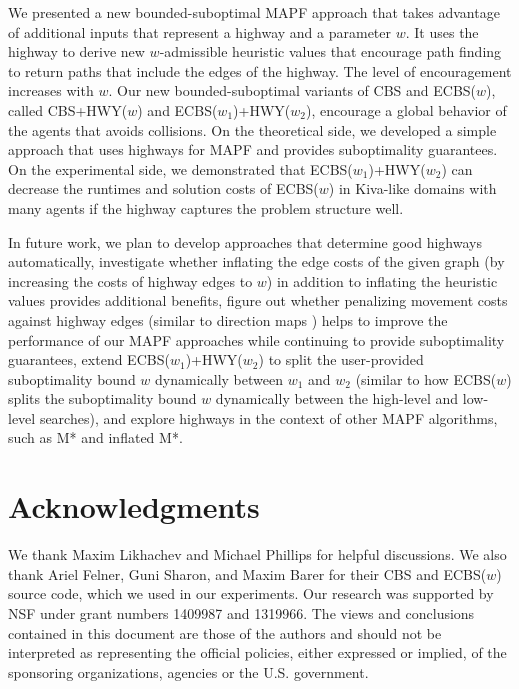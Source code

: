 \documentclass[letterpaper]{article}
\theoremstyle{definition}
\begin{document}
We presented a new bounded-suboptimal MAPF approach that takes advantage of
additional inputs that represent a highway and a parameter $w$. It uses the
highway to derive new $w$-admissible heuristic values that encourage path
finding to return paths that include the edges of the highway. The level of
encouragement increases with $w$. Our new bounded-suboptimal variants of CBS
and ECBS($w$), called CBS+HWY($w$) and ECBS($w_1$)+HWY($w_2$), encourage a
global behavior of the agents that avoids collisions. On the theoretical side,
we developed a simple approach that uses highways for MAPF and provides
suboptimality guarantees. On the experimental side, we demonstrated that
ECBS($w_1$)+HWY($w_2$) can decrease the runtimes and solution costs of
ECBS($w$) in Kiva-like domains with many agents if the highway captures the
problem structure well.

In future work, we plan to develop approaches that determine good highways
automatically, investigate whether inflating the edge costs of the given graph
(by increasing the costs of highway edges to $w$) in addition to inflating
the heuristic values provides additional benefits, figure out whether
penalizing movement costs against highway edges (similar to direction maps
\cite{JS:AIIDE:08}) helps to improve the performance of our MAPF approaches
while continuing to provide suboptimality guarantees, extend
ECBS($w_1$)+HWY($w_2$) to split the user-provided suboptimality bound $w$
dynamically between $w_1$ and $w_2$ (similar to how ECBS($w$) splits the
suboptimality bound $w$ dynamically between the high-level and low-level
searches), and explore highways in the context of other MAPF algorithms, such
as M* and inflated M*.

\section{Acknowledgments}

We thank Maxim Likhachev and Michael Phillips for helpful discussions. We also
thank Ariel Felner, Guni Sharon, and Maxim Barer for their CBS and ECBS($w$)
source code, which we used in our experiments. Our research was supported by
NSF under grant numbers 1409987 and 1319966. The views and conclusions
contained in this document are those of the authors and should not be
interpreted as representing the official policies, either expressed or
implied, of the sponsoring organizations, agencies or the U.S. government.



\end{document}
